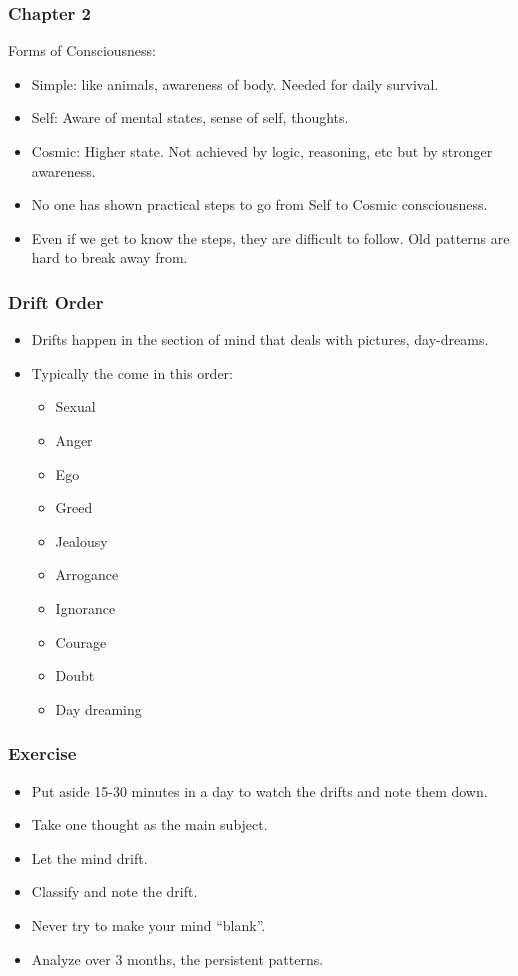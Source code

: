 \begin{frame}[fragile]
\frametitle{Chapter 2}
Forms of Consciousness:
\begin{itemize}
\item Simple: like animals, awareness of body. Needed for daily survival.
\item Self: Aware of mental states, sense of self, thoughts.
\item Cosmic: Higher state. Not achieved by logic, reasoning, etc but by stronger awareness.
\item No one has shown practical steps to go from Self to Cosmic consciousness.
\item Even if we get to know the steps, they are difficult to follow. Old patterns are hard to break away from.
\end{itemize}


\end{frame}

\begin{frame}[fragile]
\frametitle{Drift Order}
\begin{itemize}
\item Drifts happen in the section of mind that deals with pictures, day-dreams.
\item Typically the come in this order:
\begin{itemize}
\item Sexual
\item Anger
\item Ego
\item Greed
\item Jealousy
\item Arrogance
\item Ignorance
\item Courage
\item Doubt
\item Day dreaming
\end{itemize}
\end{itemize}
\end{frame}

\begin{frame}[fragile]
\frametitle{Exercise}
\begin{itemize}
\item Put aside 15-30 minutes in a day to watch the drifts and note them down.
\item Take one thought as the main subject.
\item Let the mind drift.
\item Classify and note the drift.
\item Never try to make your mind ``blank''.
\item Analyze over 3 months, the persistent patterns.
\end{itemize}
\end{frame}

